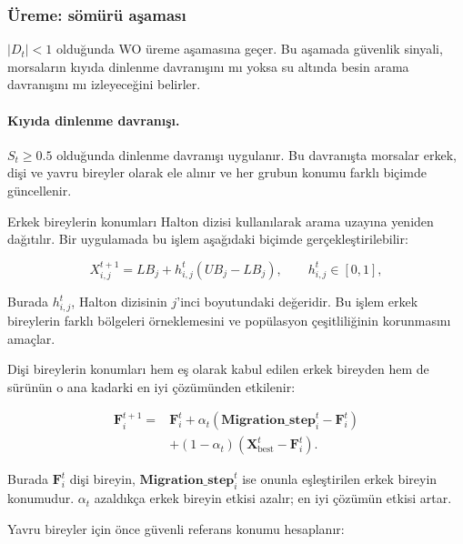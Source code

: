 \subsubsection{Üreme: sömürü aşaması}

$|D_t|<1$ olduğunda WO üreme aşamasına geçer. Bu aşamada güvenlik
sinyali, morsaların kıyıda dinlenme davranışını mı yoksa su altında
besin arama davranışını mı izleyeceğini belirler.

\paragraph{Kıyıda dinlenme davranışı.}

$S_t\geq 0.5$ olduğunda dinlenme davranışı uygulanır. Bu davranışta
morsalar erkek, dişi ve yavru bireyler olarak ele alınır ve her grubun
konumu farklı biçimde güncellenir.

Erkek bireylerin konumları Halton dizisi kullanılarak arama uzayına
yeniden dağıtılır. Bir uygulamada bu işlem aşağıdaki biçimde
gerçekleştirilebilir:

\begin{equation}
    X_{i,j}^{t+1}
    =
    LB_j+h_{i,j}^{t}(UB_j-LB_j),
    \qquad h_{i,j}^{t}\in[0,1],
    \label{eq:wo_male_halton}
\end{equation}

Burada $h_{i,j}^{t}$, Halton dizisinin $j$'inci boyutundaki değeridir.
Bu işlem erkek bireylerin farklı bölgeleri örneklemesini ve
popülasyon çeşitliliğinin korunmasını amaçlar.

Dişi bireylerin konumları hem eş olarak kabul edilen erkek bireyden
hem de sürünün o ana kadarki en iyi çözümünden etkilenir:

\begin{equation}
\begin{aligned}
    \mathbf{F}_i^{t+1}
    ={}& \mathbf{F}_i^t
    +\alpha_t\left(\mathbf{Migration\_step}_i^t-\mathbf{F}_i^t\right)\\
    &+(1-\alpha_t)
    \left(\mathbf{X}_{\mathrm{best}}^t-\mathbf{F}_i^t\right).
\end{aligned}
\label{eq:wo_female}
\end{equation}

Burada $\mathbf{F}_i^t$ dişi bireyin, $\mathbf{Migration\_step}_i^t$ ise onunla
eşleştirilen erkek bireyin konumudur. $\alpha_t$ azaldıkça erkek
bireyin etkisi azalır; en iyi çözümün etkisi artar.

Yavru bireyler için önce güvenli referans konumu hesaplanır:

